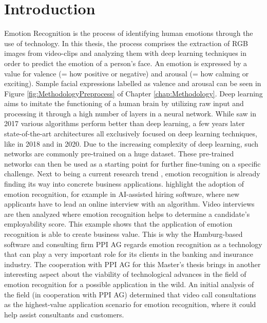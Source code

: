 
\chapter{Introduction}
Emotion Recognition is the process of identifying human emotions through the use of technology. In this thesis, the process comprises the extraction of RGB images from video-clips and analyzing them with deep learning techniques in order to predict the emotion of a person's face. An emotion is expressed by a value for valence (= how positive or negative) and arousal (= how calming or exciting). Sample facial expressions labelled as valence and arousal can be seen in Figure \ref{fig:MethodologyPreprocess} of Chapter \ref{chap:Methodology}.
\newline\newline
Deep learning aims to imitate the functioning of a human brain by utilizing raw input and processing it through a high number of layers in a neural network. While \citet{Kossaifi:2017:AFEW-VADatabase} saw in 2017 various algorithms perform better than deep learning, a few years later state-of-the-art architectures all exclusively focused on deep learning techniques, like \citet{Theagarajan:2018:DeepDriver} in 2018 and \citet{Handrich:2020:SimultaneousPredVA} in 2020. Due to the increasing complexity of deep learning, such networks are commonly pre-trained on a huge dataset. These pre-trained networks can then be used as a starting point for further fine-tuning on a specific challenge.
\newline\newline
Next to being a current research trend \citep{Chen:2020:EmotionAI}  \citep{Handrich:2020:SimultaneousPredVA}, emotion recognition is already finding its way into concrete business applications. \citet{Chen:2020:EmotionAI} highlight the adoption of emotion recognition, for example in AI-assisted hiring software, where new applicants have to lead an online interview with an algorithm. Video interviews are then analyzed where emotion recognition helps to determine a candidate's employability score. This example shows that the application of emotion recognition is able to create business value.
\newline\newline
This is why the Hamburg-based software and consulting firm PPI AG regards emotion recognition as a technology that can play a very important role for its clients in the banking and insurance industry. The cooperation with PPI AG for this Master's thesis brings in another interesting aspect about the viability of technological advances in the field of emotion recognition for a possible application in the wild. An initial analysis of the field (in cooperation with PPI AG) determined that video call consultations as the highest-value application scenario for emotion recognition, where it could help assist consultants and customers.

